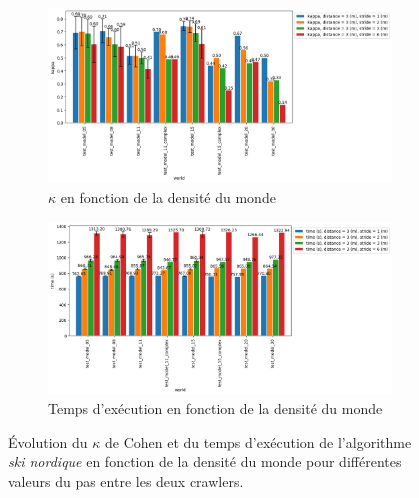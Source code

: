 \documentclass[english,RandD]{rapportPFE}  %
\begin{document}
			\begin{figure}[h!]
				\centering
				\begin{subfigure}[t]{0.9\linewidth}
					\includegraphics[width=\linewidth]{graphics/ski_nordique-kappa_vs_world_for_each_s.png}
					\caption{$\kappa$ en fonction de la densité du monde}
					\label{fig:ski_nordique-kappa_vs_world_s}
				\end{subfigure}
				\hfill
				\begin{subfigure}[t]{0.9\linewidth}
						\includegraphics[width=\linewidth]{graphics/ski_nordique-time_vs_world_for_each_s.png}
						\caption{Temps d'exécution en fonction de la densité du monde}
						\label{fig:ski_nordique-time_vs_world_s}
				\end{subfigure}
				\caption{Évolution du $\kappa$ de Cohen et du temps d'exécution de l'algorithme \textit{ski nordique} en fonction de la densité du monde pour différentes valeurs du pas entre les deux crawlers.}
				\label{fig:ski_nordique-world_s}
			\end{figure}
\end{document}
